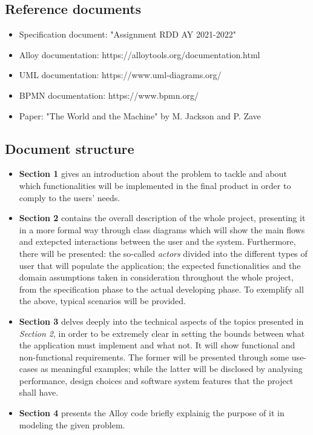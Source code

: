 \documentclass[table, 12pt]{article}
\begin{document}
\subsection{Reference documents}
\begin{itemize}
    \item Specification document: "Assignment RDD AY 2021-2022"
    \item Alloy documentation: https://alloytools.org/documentation.html
    \item UML documentation: https://www.uml-diagrams.org/
    \item BPMN documentation: https://www.bpmn.org/
    \item Paper: "The World and the Machine" by M. Jackson and P. Zave
\end{itemize}

\subsection{Document structure}
\begin{itemize}
    \item \textbf{Section 1} gives an introduction about the problem to tackle and about which functionalities will be implemented in the final product in order to comply to the users' needs.
    \item \textbf{Section 2} contains the overall description of the whole project, presenting it in a more formal way through class diagrams which will show the main flows and extepcted interactions between the user and the system. Furthermore, there will be presented: the so-called \emph{actors} divided into the different types of user that will populate the application; the expected functionalities and the domain assumptions taken in consideration throughout the whole project, from the specification phase to the actual developing phase. To exemplify all the above, typical scenarios will be provided.
    \item \textbf{Section 3} delves deeply into the technical aspects of the topics presented in \emph{Section 2}, in order to be extremely clear in setting the bounds between what the application must implement and what not. It will show functional and non-functional requirements. The former will be presented through some use-cases as meaningful examples; while the latter will be disclosed by analysing performance, design choices and software system features that the project shall have.
    \item \textbf{Section 4} presents the Alloy code briefly explainig the purpose of it in modeling the given problem.
\end{itemize}
\end{document}
